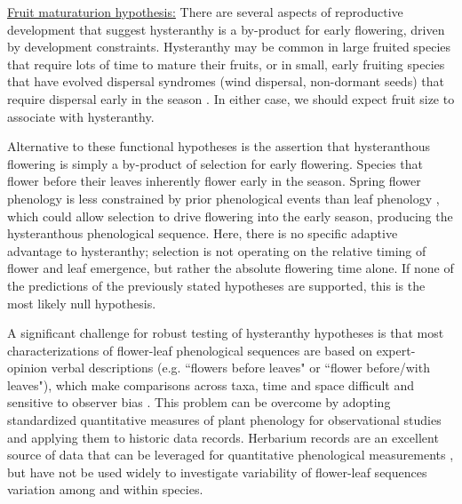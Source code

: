 \documentclass{article}[11pt]
\begin{document}
\underline{Fruit maturaturion hypothesis:} There are several aspects of reproductive development that suggest hysteranthy is a by-product for early flowering, driven by development constraints. Hysteranthy may be common in large fruited species that require lots of time to mature their fruits, or in small, early fruiting species that have evolved dispersal syndromes (wind dispersal, non-dormant seeds) that require dispersal early in the season \citep{Primack1987}. In either case, we should expect fruit size to associate with hysteranthy.

Alternative to these functional hypotheses is the assertion that hysteranthous flowering is simply a by-product of selection for early flowering. Species that flower before their leaves inherently flower early in the season. Spring flower phenology is less constrained by prior phenological events than leaf phenology \citep{Savage2019}, which could allow selection to drive flowering into the early season, producing the hysteranthous phenological sequence. Here, there is no specific adaptive advantage to hysteranthy;  selection is not operating on the relative timing of flower and leaf emergence, but rather the absolute flowering time alone. If none of the predictions of the previously stated hypotheses are supported, this is the most likely null hypothesis.

\noindent A significant challenge for robust testing of hysteranthy hypotheses is that most characterizations of flower-leaf phenological sequences are based on expert-opinion verbal descriptions (e.g. ``flowers before leaves" or ``flower before/with leaves"), which make comparisons across taxa, time and space difficult and sensitive to observer bias  \citep[see;][]{Buonaiuto2020}. This problem can be overcome by adopting standardized quantitative measures of plant phenology for observational studies and applying them to historic data records. Herbarium records are an excellent source of data that can be leveraged for quantitative phenological measurements \citep{Willis2017}, but have not be used widely to investigate variability of flower-leaf sequences variation among and within species.
\end{document}
